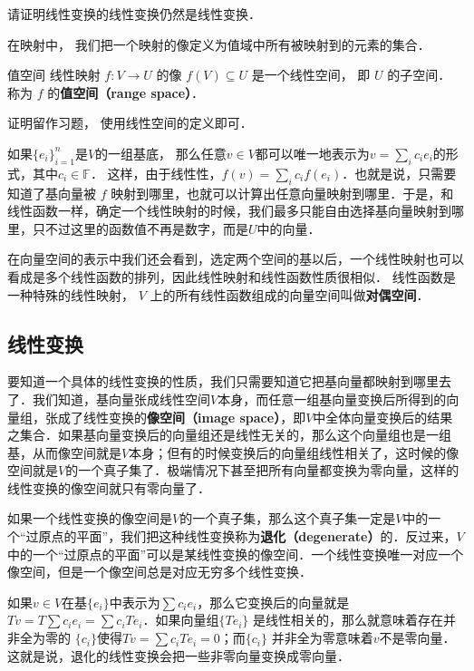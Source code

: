 \begin{exercise}{}
请证明线性变换的线性变换仍然是线性变换．
\end{exercise}

在映射中， 我们把一个映射的像定义为值域中所有被映射到的元素的集合．
\begin{theorem}{值空间}
线性映射 $f:V\to U$ 的像 $f(V) \subseteq U$ 是一个线性空间， 即 $U$ 的子空间． 称为 $f$ 的\textbf{值空间（range space）}．
\end{theorem}
证明留作习题， 使用线性空间的定义即可．

如果$\{{e}_i\}_{i=1}^n$是$V$的一组基底， 那么任意${v}\in V$都可以唯一地表示为${v}=\sum_i c_i {e}_i$的形式，其中$c_i\in\mathbb{F}$． 这样，由于线性性，$f({v})=\sum_ic_if({e}_i)$．也就是说，只需要知道了基向量被 $f$ 映射到哪里，也就可以计算出任意向量映射到哪里．于是，和线性函数一样，确定一个线性映射的时候，我们最多只能自由选择基向量映射到哪里，只不过这里的函数值不再是数字，而是$U$中的向量．

在向量空间的表示中我们还会看到，选定两个空间的基以后，一个线性映射也可以看成是多个线性函数的排列，因此线性映射和线性函数性质很相似． 线性函数是一种特殊的线性映射， $V$ 上的所有线性函数组成的向量空间叫做\textbf{对偶空间}．

\subsection{线性变换}

要知道一个具体的线性变换的性质，我们只需要知道它把基向量都映射到哪里去了．我们知道，基向量张成线性空间$V$本身，而任意一组基向量变换后所得到的向量组，张成了线性变换的\textbf{像空间（image space）}，即$V$中全体向量变换后的结果之集合．如果基向量变换后的向量组还是线性无关的，那么这个向量组也是一组基，从而像空间就是$V$本身；但有的时候变换后的向量组线性相关了，这时候的像空间就是$V$的一个真子集了．极端情况下甚至把所有向量都变换为零向量，这样的线性变换的像空间就只有零向量了．

如果一个线性变换的像空间是$V$的一个真子集，那么这个真子集一定是$V$中的一个“过原点的平面”，我们把这种线性变换称为\textbf{退化（degenerate）}的．反过来，$V$中的一个“过原点的平面”可以是某线性变换的像空间．一个线性变换唯一对应一个像空间，但是一个像空间总是对应无穷多个线性变换．

如果${v}\in V$在基$\{{e}_i\}$中表示为$\sum c_i {e}_i$，那么它变换后的向量就是$T {v}=T\sum c_i {e}_i=\sum c_iT {e}_i$．如果向量组$\{T {e}_i\}$ 是线性相关的，那么就意味着存在并非全为零的 $\{c_i\}$使得$T {v}=\sum c_iT {e}_i=0$；而$\{c_i\}$ 并非全为零意味着${v}$不是零向量．这就是说，退化的线性变换会把一些非零向量变换成零向量．

